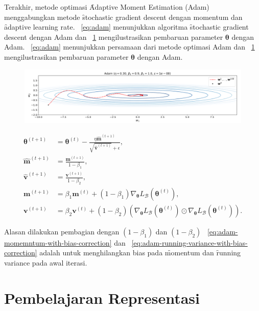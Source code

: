 Terakhir, metode optimasi \f{Adaptive Moment Estimation} (Adam) menggabungkan metode \f{stochastic gradient descent} dengan momentum dan \f{adaptive learning rate}. \equ~\ref{eq:adam} menunjukkan algoritma \f{stochastic gradient descent} dengan Adam dan \pic~\ref{fig:adam} mengilustrasikan pembaruan parameter $\bm{\theta}$ dengan Adam. \equ~\ref{eq:adam} menunjukkan persamaan dari metode optimasi Adam dan \pic~\ref{fig:adam} mengilustrasikan pembaruan parameter $\bm{\theta}$ dengan Adam.
\begin{figure}
    \centering
    \includegraphics[width=1\textwidth]{assets/pics/adam.png}
    \label{fig:adam}
\end{figure}
\begin{align}
    \label{eq:adam}
    \bm{\theta}^{(t+1)} &= \bm{\theta}^{(t)} - \frac{\eta \hat{\mathbf{m}}^{(t+1)}}{\sqrt{\hat{\mathbf{v}}^{(t+1)}} + \epsilon}, \\
    \label{eq:adam-momemntum-with-bias-correction}
    \hat{\mathbf{m}}^{(t+1)} &= \frac{\mathbf{m}^{(t+1)}}{1 - \beta_1}, \\
    \label{eq:adam-running-variance-with-bias-correction}
    \hat{\mathbf{v}}^{(t+1)} &= \frac{\mathbf{v}^{(t+1)}}{1 - \beta_2}, \\
    \mathbf{m}^{(t+1)} &= \beta_1 \mathbf{m}^{(t)} + (1 - \beta_1) \nabla_{\bm{\theta}} L_{\mathcal{B}}(\bm{\theta}^{(t)}), \\
    \mathbf{v}^{(t+1)} &= \beta_2 \mathbf{v}^{(t)} + (1 - \beta_2) \left(\nabla_{\bm{\theta}} L_{\mathcal{B}}(\bm{\theta}^{(t)})\odot \nabla_{\bm{\theta}} L_{\mathcal{B}}(\bm{\theta}^{(t)})\right).
\end{align}

Alasan dilakukan pembagian dengan $(1-\beta_1)$ dan $(1-\beta_2)$ \equ~\ref{eq:adam-momemntum-with-bias-correction} dan \equ~\ref{eq:adam-running-variance-with-bias-correction} adalah untuk menghilangkan bias pada \f{momentum} dan \f{running variance} pada awal iterasi.


\section{Pembelajaran Representasi}
